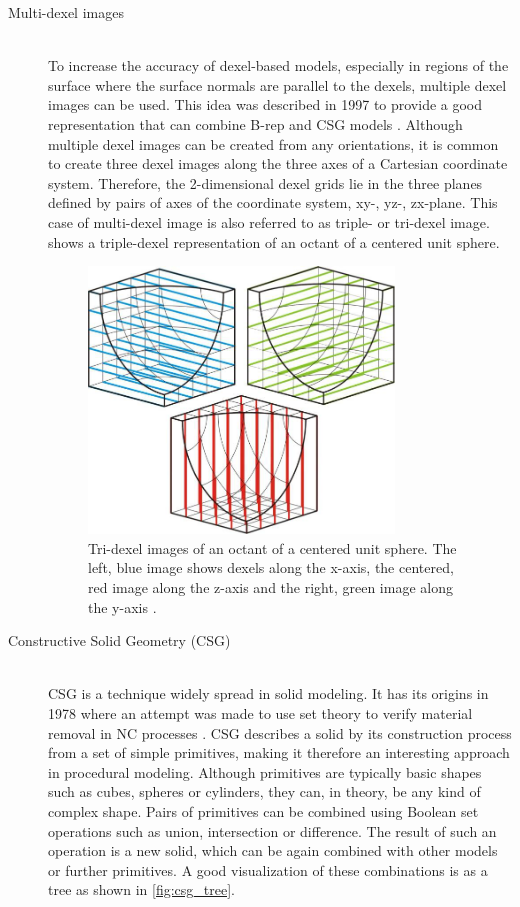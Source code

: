 \begin{description}
	\item[Multi-dexel images] \hfill \\
	To increase the accuracy of dexel-based models, especially in regions of the surface where the surface normals are parallel to the dexels, multiple dexel images can be used.
	This idea was described in 1997 to provide a good representation that can combine B-rep and CSG models \cite{tridexel_intersection}.
	Although multiple dexel images can be created from any orientations, it is common to create three dexel images along the three axes of a Cartesian coordinate system.
	Therefore, the 2-dimensional dexel grids lie in the three planes defined by pairs of axes of the coordinate system, \ie xy-, yz-, zx-plane.
	This case of multi-dexel image is also referred to as triple- or tri-dexel image.
	 shows a triple-dexel representation of an octant of a centered unit sphere.

	\begin{figure}[H]
		\centering
		\includegraphics[width=0.8\textwidth]{images/tridexels}
		\caption[Tri-dexel image]{
			Tri-dexel images of an octant of a centered unit sphere.
			The left, blue image shows dexels along the x-axis, the centered, red image along the z-axis and the right, green image along the y-axis \cite{virtual_machining_review}.
		}
		\label{fig:tri_dexel_image}
	\end{figure}


	\item[Constructive Solid Geometry (CSG)] \hfill \\
	CSG is a technique widely spread in solid modeling.
	It has its origins in 1978 where an attempt was made to use set theory to verify material removal in NC processes \cite{csg}.
	CSG describes a solid by its construction process from a set of simple primitives, making it therefore an interesting approach in procedural modeling.
	Although primitives are typically basic shapes such as cubes, spheres or cylinders, they can, in theory, be any kind of complex shape.
	Pairs of primitives can be combined using Boolean set operations such as union, intersection or difference.
	The result of such an operation is a new solid, which can be again combined with other models or further primitives.
	A good visualization of these combinations is as a tree as shown in \cref{fig:csg_tree}.


\end{description}
